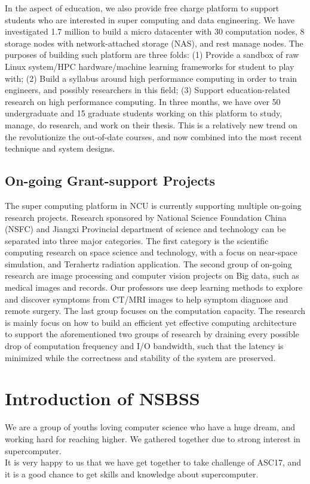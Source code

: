 \documentclass[conference,compsoc]{appendix/report}
\begin{document}
In the aspect of education, we also provide free charge platform to support students who are interested in super computing and data engineering. We have investigated 1.7 million to build a micro datacenter with 30 computation nodes, 8 storage nodes with network-attached storage (NAS), and rest manage nodes. The purposes of building such platform are three folds: (1) Provide a sandbox of raw Linux system/HPC hardware/machine learning frameworks for student to play with; (2) Build a syllabus around high performance computing in order to train engineers, and possibly researchers in this field; (3) Support education-related research on high performance computing. In three months, we have over 50 undergraduate and 15 graduate students working on this platform to study, manage, do research, and work on their thesis. This is a relatively new trend on the revolutionize the out-of-date courses, and now combined into the most recent technique and system designs.

\subsection{On-going Grant-support Projects}

The super computing platform in NCU is currently supporting multiple on-going research projects. Research sponsored by National Science Foundation China (NSFC) and Jiangxi Provincial department of science and technology can be separated into three major categories. The first category is the scientific computing research on space science and technology, with a focus on near-space simulation, and Terahertz radiation application. The second group of on-going research are image processing and computer vision projects on Big data, such as medical images and records. Our professors use deep learning methods to explore and discover symptoms from CT/MRI images to help symptom diagnose and remote surgery. The last group focuses on the computation capacity. The research is mainly focus on how to build an efficient yet effective computing architecture to support the aforementioned two groups of research by draining every possible drop of computation frequency and I/O bandwidth, such that the latency is minimized while the correctness and stability of the system are preserved.


\section{Introduction of NSBSS}
We are a group of youths loving computer science who have a
huge dream, and working hard for reaching higher. We gathered
together due to strong interest in supercomputer.\\
It is very happy to us that we have get together to take challenge of ASC17, and it is a good chance to get skills and knowledge about supercomputer.\\
\end{document}
